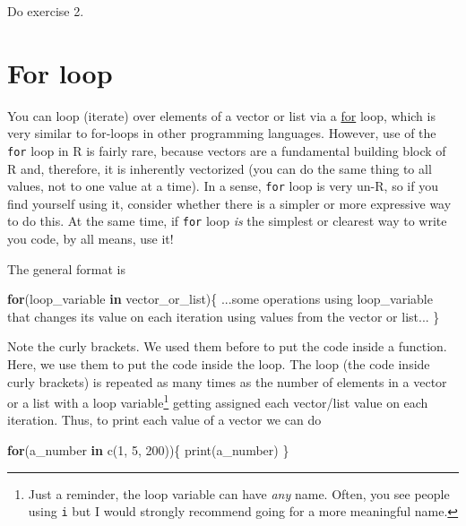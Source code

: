 \documentclass[
]{book}
\newenvironment{Shaded}{\begin{snugshade}}{\end{snugshade}}
\newcommand{\ControlFlowTok}[1]{\textcolor[rgb]{0.13,0.29,0.53}{\textbf{#1}}}
\newcommand{\DecValTok}[1]{\textcolor[rgb]{0.00,0.00,0.81}{#1}}
\newcommand{\FunctionTok}[1]{\textcolor[rgb]{0.00,0.00,0.00}{#1}}
\newcommand{\NormalTok}[1]{#1}
\begin{document}
Do exercise 2.

\hypertarget{forloop}{%
\section{For loop}\label{forloop}}

You can loop (iterate) over elements of a vector or list via a \href{https://stat.ethz.ch/R-manual/R-devel/library/base/html/Control.html}{for} loop, which is very similar to for-loops in other programming languages. However, use of the \texttt{for} loop in R is fairly rare, because vectors are a fundamental building block of R and, therefore, it is inherently vectorized (you can do the same thing to all values, not to one value at a time). In a sense, \texttt{for} loop is very un-R, so if you find yourself using it, consider whether there is a simpler or more expressive way to do this. At the same time, if \texttt{for} loop \emph{is} the simplest or clearest way to write you code, by all means, use it!

The general format is

\begin{Shaded}
\begin{Highlighting}[]
\ControlFlowTok{for}\NormalTok{(loop\_variable }\ControlFlowTok{in}\NormalTok{ vector\_or\_list)\{}
\NormalTok{  ...some operations using loop\_variable that}
\NormalTok{  changes its value on each iteration using}
\NormalTok{  values from the vector or list... }
\NormalTok{\}}
\end{Highlighting}
\end{Shaded}

Note the curly brackets. We used them before to put the code inside a function. Here, we use them to put the code inside the loop. The loop (the code inside curly brackets) is repeated as many times as the number of elements in a vector or a list with a loop variable\footnote{Just a reminder, the loop variable can have \emph{any} name. Often, you see people using \texttt{i} but I would strongly recommend going for a more meaningful name.} getting assigned each vector/list value on each iteration. Thus, to print each value of a vector we can do

\begin{Shaded}
\begin{Highlighting}[]
\ControlFlowTok{for}\NormalTok{(a\_number }\ControlFlowTok{in} \FunctionTok{c}\NormalTok{(}\DecValTok{1}\NormalTok{, }\DecValTok{5}\NormalTok{, }\DecValTok{200}\NormalTok{))\{}
  \FunctionTok{print}\NormalTok{(a\_number)}
\NormalTok{\}}
\end{Highlighting}
\end{Shaded}
\end{document}
